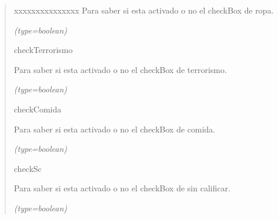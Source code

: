 \begin{boxedminipage}{\funcwidth}
\begin{quote}
\begin{Ventry}{xxxxxxxxxxxxxxx}
          Para saber si esta activado o no el checkBox de ropa.

            {\it (type=boolean)}

          \item[checkTerrorismo]

          Para saber si esta activado o no el checkBox de terrorismo.

            {\it (type=boolean)}

          \item[checkComida]

          Para saber si esta activado o no el checkBox de comida.

            {\it (type=boolean)}

          \item[checkSc]

          Para saber si esta activado o no el checkBox de sin calificar.

            {\it (type=boolean)}

        \end{Ventry}

      \end{quote}

    \end{boxedminipage}

    \label{grafo:Grafo:sacarSeguidosSegundoNivelAlgunasCategorias}

    \vspace{0.5ex}

